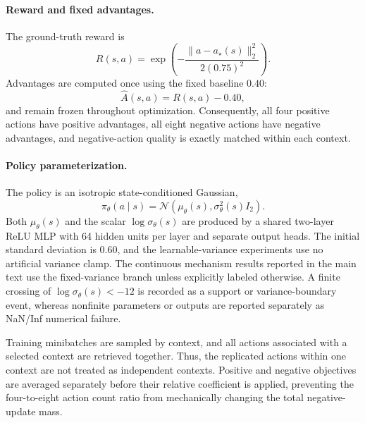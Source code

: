 \documentclass{article}
\theoremstyle{plain}
\theoremstyle{definition}
\theoremstyle{remark}
\begin{document}
\paragraph{Reward and fixed advantages.}
The ground-truth reward is
\begin{equation}
    R(s,a)
    =
    \exp
    \left(
        -
        \frac{
            \lVert a-a_\star(s)\rVert_2^2
        }{
            2(0.75)^2
        }
    \right).
    \label{eq:cu1_reward}
\end{equation}
Advantages are computed once using the fixed baseline $0.40$:
\begin{equation}
    \widehat A(s,a)
    =
    R(s,a)-0.40,
    \label{eq:cu1_advantage}
\end{equation}
and remain frozen throughout optimization. Consequently, all four
positive actions have positive advantages, all eight negative actions
have negative advantages, and negative-action quality is exactly matched
within each context.

\paragraph{Policy parameterization.}
The policy is an isotropic state-conditioned Gaussian,
\begin{equation}
    \pi_\theta(a\mid s)
    =
    \mathcal N
    \left(
        \mu_\theta(s),
        \sigma_\theta^2(s)I_2
    \right).
    \label{eq:cu1_policy}
\end{equation}
Both $\mu_\theta(s)$ and the scalar
$\log\sigma_\theta(s)$
are produced by a shared two-layer ReLU MLP with 64 hidden units per
layer and separate output heads. The initial standard deviation is
$0.60$, and the learnable-variance experiments use no artificial
variance clamp.  The continuous mechanism results reported in the main
text use the fixed-variance branch unless explicitly labeled otherwise. A finite crossing of
$\log\sigma_\theta(s)<-12$
is recorded as a support or variance-boundary event, whereas nonfinite
parameters or outputs are reported separately as NaN/Inf numerical
failure.

Training minibatches are sampled by context, and all actions associated
with a selected context are retrieved together. Thus, the replicated
actions within one context are not treated as independent contexts.
Positive and negative objectives are averaged separately before their
relative coefficient is applied, preventing the four-to-eight action
count ratio from mechanically changing the total negative-update mass.
\end{document}
